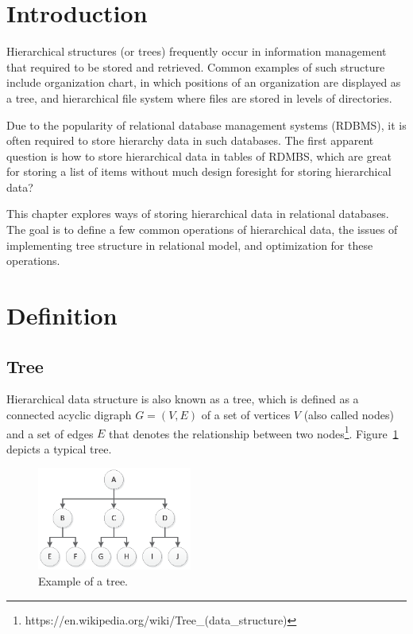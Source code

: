 \section{Introduction}\label{section-introduction}


Hierarchical structures (or trees) frequently occur in information management that required to be stored and retrieved. Common examples of such structure include organization chart, in which positions of an organization are displayed as a tree, and hierarchical file system where files are stored in levels of directories.

Due to the popularity of relational database management systems (RDBMS), it is often required to store hierarchy data in such databases. The first apparent question is how to store hierarchical data in tables of RDMBS, which are great for storing a list of items without much design foresight for storing hierarchical data?

This chapter explores ways of storing hierarchical data in relational databases. The goal is to define a few common operations of hierarchical data, the issues of implementing tree structure in relational model, and optimization for these operations.

\section{Definition}\label{section-definition}

\subsection{Tree}\label{section-tree}

Hierarchical data structure is also known as a tree, which is defined as a connected acyclic digraph $G=(V,E)$ of a set of vertices $V$ (also called nodes) and a set of edges $E$ that denotes the relationship between two nodes\footnote{https://en.wikipedia.org/wiki/Tree\_(data\_structure)}. Figure~\ref{fig:tree} depicts a typical tree.

\begin{figure}[!h]
\begin{center}
\includegraphics[width=2in]{images/tree.eps}
\caption{Example of a tree.\label{fig:tree}}
\end{center}
\end{figure}

